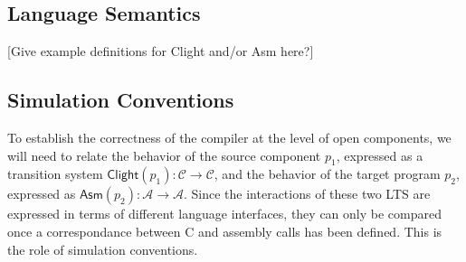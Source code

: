 \documentclass[sigplan,10pt,review,anonymous]{acmart}
\newcommand{\kw}[1]{\ensuremath{ \mathsf{#1} }}
\newcommand{\bind}{\gg\!\!=}
\begin{document}


\cbstart
\subsection{Language Semantics} %

[Give example definitions for Clight and/or Asm here?]


\subsection{Simulation Conventions} \label{sec:sem:simconv} %

To establish the correctness of the compiler
at the level of open components,
we will need to relate the behavior of the source component
$p_1$,
expressed as a transition system
$\kw{Clight}(p_1) : \mathcal{C} \rightarrow \mathcal{C}$,
and the behavior of the target program $p_2$,
expressed as
$\kw{Asm}(p_2) : \mathcal{A} \rightarrow \mathcal{A}$.
Since the interactions of these two LTS
are expressed in terms of different language interfaces,
they can only be compared once a correspondance between
C and assembly calls has been defined.
This is the role of simulation conventions.
\end{document}
